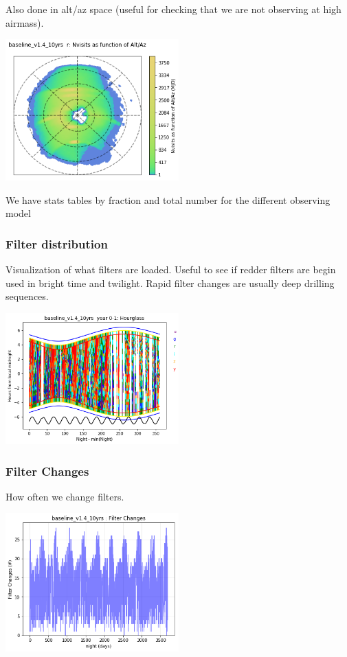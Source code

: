 {Also done in alt/az space (useful for checking that we are not observing at high airmass).

\includegraphics[width=0.5\textwidth]{metric_summary/glance/thumb.baseline_v1_4_10yrs_Nvisits_as_function_of_Alt_Az_r_HEAL_SkyMap.png}

We have stats tables by fraction and total number for the different observing model

\subsubsection{Filter distribution}

Visualization of what filters are loaded. Useful to see if redder filters are begin used in bright time and twilight. Rapid filter changes are usually deep drilling sequences.

\includegraphics[width=0.5\textwidth]{metric_summary/glance/thumb.baseline_v1_4_10yrs_Hourglass_year_0-1_HOUR_Hourglass.png}

\subsubsection{Filter Changes}

How often we change filters.

\includegraphics[width=0.5\textwidth]{metric_summary/glance/thumb.baseline_v1_4_10yrs_Filter_Changes_ONED_BinnedData.png}

}
